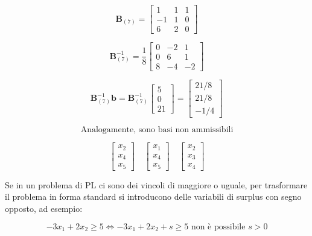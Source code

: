 \documentclass[a4paper, 11pt]{article}
\begin{document}
                \[
                    \mathbf{B}_{(7)} = \begin{bmatrix} 1 & 1 & 1 \\ -1 & 1 & 0 \\ 6 & 2 & 0 \end{bmatrix}
                \]
    

                \[
                    \mathbf{B}_{(7)}^{-1} = \frac{1}{8} \begin{bmatrix} 0 & -2 & 1 \\ 0 & 6 & 1 \\ 8 & -4 & -2 \end{bmatrix}
                \]

    
                \[
                    \mathbf{B}_{(7)}^{-1} \mathbf{b} = \mathbf{B}_{(7)}^{-1} \begin{bmatrix} 5 \\ 0 \\ 21 \end{bmatrix} = \begin{bmatrix} 21/8 \\ 21/8 \\ -1/4 \end{bmatrix}
                \]
    

                \[
                    \text{Analogamente, sono basi non ammissibili}
                \]    
    

                \[
                    \begin{bmatrix} x_2 \\ x_4 \\ x_5 \end{bmatrix} \quad \begin{bmatrix} x_1 \\ x_4 \\ x_5 \end{bmatrix} \quad \begin{bmatrix} x_2 \\ x_3 \\ x_4 \end{bmatrix}
                \]

                Se in un problema di PL ci sono dei vincoli di maggiore o uguale, per trasformare il problema in forma standard si introducono delle variabili di surplus con segno opposto, ad esempio:

                \[
                    -3x_1+2x_2 \geq 5 \Leftrightarrow -3x_1+2x_2 + s \geq 5 \text{ non è possibile $s > 0 $}
                \]
\end{document}
